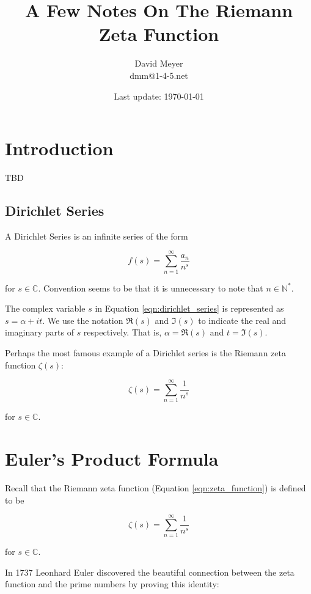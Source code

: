 \documentclass[11pt, oneside]{article}   	%
\title{A Few Notes On The Riemann Zeta Function}
\author{David Meyer \\ dmm@1-4-5.net}
\date{Last update: \today}							%
\theoremstyle{definition}
\begin{document}
\maketitle

\section{Introduction}
TBD

\subsection{Dirichlet Series}
A Dirichlet Series \cite{mccarthy2018} is an infinite series of the form

\bigskip
\begin{equation}
f(s) = \sum\limits_{n = 1}^{\infty} \frac{a_n}{n^s}
\label{eqn:dirichlet_series}
\end{equation}

\bigskip
\noindent
for $s \in \mathbb{C}$. Convention seems to be that it is unnecessary to note that $n \in \mathbb{N}^*$.  

\bigskip
\noindent
The complex variable $s$ in Equation \ref{eqn:dirichlet_series} is represented as $s = \alpha + i t$. We use the 
notation $ \Re(s)$ and $\Im(s)$ to indicate the real and imaginary parts of $s$ respectively. That is, 
$\alpha = \Re(s)$ and $t = \Im(s)$.


\bigskip
\noindent
Perhaps the most famous example of a Dirichlet series is the Riemann zeta function $\zeta(s)$:

\bigskip
\begin{equation}
\zeta(s) = \sum^\infty_{n = 1} \frac{1}{n^s}
\label{eqn:zeta_function}
\end{equation}

\bigskip
\noindent
for $s \in \mathbb{C}$. 

\section{Euler's Product Formula}
Recall that the Riemann zeta function (Equation \ref{eqn:zeta_function}) is defined to be

\medskip
\begin{equation*}
\zeta(s) = \sum^\infty_{n = 1} \frac{1}{n^s}
\end{equation*}

\noindent
for $s \in \mathbb{C}$.

\bigskip
\noindent
In 1737 Leonhard Euler \cite{euler_product_formula} discovered the beautiful connection between the zeta function and the prime numbers by proving this identity:
\end{document}
